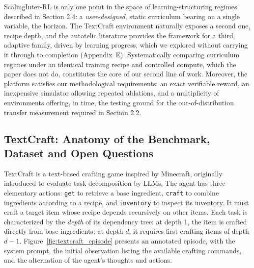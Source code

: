 \documentclass[11pt,a4paper]{article}
\begin{document}
ScalingInter-RL is only one point in the space of learning-structuring regimes described in Section 2.4: a \emph{user-designed}, static curriculum bearing on a single variable, the horizon. The TextCraft environment naturally exposes a second one, recipe depth, and the autotelic literature provides the framework for a third, adaptive family, driven by learning progress, which we explored without carrying it through to completion (Appendix~E). Systematically comparing curriculum regimes under an identical training recipe and controlled compute, which the paper does not do, constitutes the core of our second line of work. Moreover, the platform satisfies our methodological requirements: an exact verifiable reward, an inexpensive simulator allowing repeated ablations, and a multiplicity of environments offering, in time, the testing ground for the out-of-distribution transfer measurement required in Section 2.2.




\subsection{TextCraft: Anatomy of the Benchmark, Dataset and Open Questions}

TextCraft \cite{prasad2023adapt} is a text-based crafting game inspired by Minecraft, originally introduced to evaluate task decomposition by LLMs. The agent has three elementary actions: \texttt{get} to retrieve a base ingredient, \texttt{craft} to combine ingredients according to a recipe, and \texttt{inventory} to inspect its inventory. It must craft a target item whose recipe depends recursively on other items. Each task is characterized by the \emph{depth} of its dependency tree: at depth 1, the item is crafted directly from base ingredients; at depth $d$, it requires first crafting items of depth $d-1$. Figure~\ref{fig:textcraft_episode} presents an annotated episode, with the system prompt, the initial observation listing the available crafting commands, and the alternation of the agent's thoughts and actions.
\end{document}
